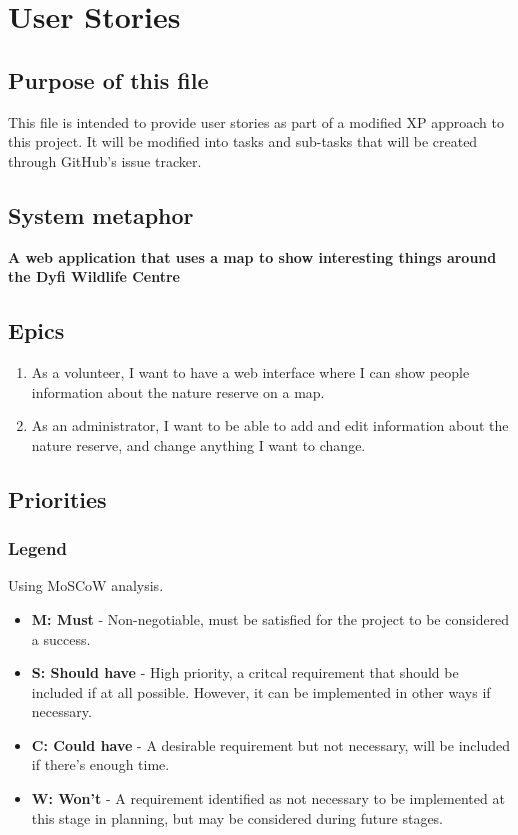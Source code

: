 \chapter{User Stories}


\section{Purpose of this file}

This file is intended to provide user stories as part of a modified XP approach to this project. It will be modified into tasks and sub-tasks that will be created through GitHub's issue tracker.

\section{System metaphor}

\textbf{A web application that uses a map to show interesting things around the Dyfi Wildlife Centre}

\section{Epics}

\begin{enumerate}
	\item As a volunteer, I want to have a web interface where I can show people information about the nature reserve on a map.
	\item As an administrator, I want to be able to add and edit information about the nature reserve, and change anything I want to change.
\end{enumerate}

\section{Priorities}

\subsection{Legend}

Using MoSCoW analysis.

\begin{itemize}
	\item \textbf{M: Must} - Non-negotiable, must be satisfied for the project to be considered a success.
	\item \textbf{S: Should have} - High priority, a critcal requirement that should be included if at all possible. However, it can be implemented in other ways if necessary.
	\item \textbf{C: Could have} - A desirable requirement but not necessary, will be included if there's enough time.
	\item \textbf{W: Won't} - A requirement identified as not necessary to be implemented at this stage in planning, but may be considered during future stages.
\end{itemize}

